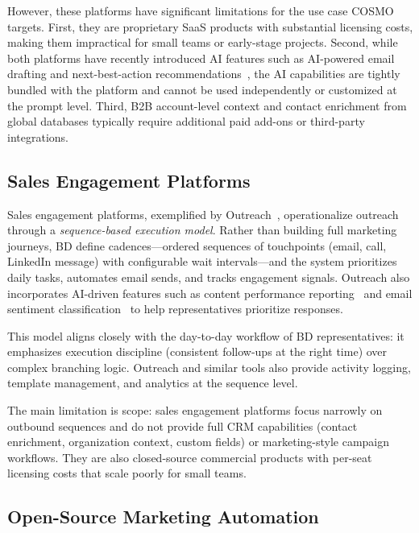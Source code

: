 \documentclass[a4paper]{article}
\begin{document}
However, these platforms have significant limitations for the use case 
COSMO targets. First, they are proprietary SaaS products with 
substantial licensing costs, making them impractical for small teams 
or early-stage projects. Second, while both platforms have recently 
introduced AI features such as AI-powered email drafting and 
next-best-action recommendations~\cite{hubspot_ai_email_creation, 
salesforce_einstein_gpt_sales_emails, salesforce_nba_about}, the AI 
capabilities are tightly bundled with the platform and cannot be 
used independently or customized at the prompt level. Third, B2B 
account-level context and contact enrichment from global databases 
typically require additional paid add-ons or third-party integrations.

\subsection{Sales Engagement Platforms}

Sales engagement platforms, exemplified by 
Outreach~\cite{outreach_sales_engagement}, operationalize outreach 
through a \emph{sequence-based execution model}. Rather than building 
full marketing journeys, BD define 
cadences---ordered sequences of touchpoints (email, call, LinkedIn 
message) with configurable wait intervals---and the system prioritizes 
daily tasks, automates email sends, and tracks engagement signals. 
Outreach also incorporates AI-driven features such as content 
performance reporting~\cite{outreach_ai_content_reporting} and email 
sentiment classification~\cite{outreach_sentiment_classification} to 
help representatives prioritize responses.

This model aligns closely with the day-to-day workflow of BD 
representatives: it emphasizes execution discipline (consistent 
follow-ups at the right time) over complex branching logic. Outreach 
and similar tools also provide activity logging, template management, 
and analytics at the sequence level.

The main limitation is scope: sales engagement platforms focus 
narrowly on outbound sequences and do not provide full CRM capabilities 
(contact enrichment, organization context, custom fields) or 
marketing-style campaign workflows. They are also closed-source 
commercial products with per-seat licensing costs that scale poorly 
for small teams.

\subsection{Open-Source Marketing Automation}
\end{document}
